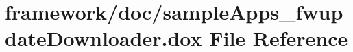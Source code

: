 \hypertarget{sample_apps__fwupdate_downloader_8dox}{}\section{framework/doc/sample\+Apps\+\_\+fwupdate\+Downloader.dox File Reference}
\label{sample_apps__fwupdate_downloader_8dox}
